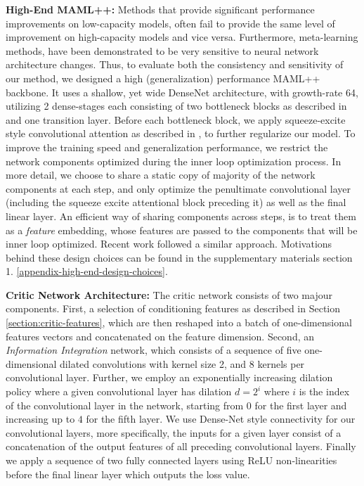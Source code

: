 \documentclass{article} \usepackage[dvipsnames]{xcolor}
\begin{document}
\textbf{High-End MAML++:}
Methods that provide significant performance improvements on low-capacity models, often fail to provide the same level of improvement on high-capacity models and vice versa. Furthermore, meta-learning methods, have been demonstrated to be very sensitive to neural network architecture changes. Thus, to evaluate both the consistency and sensitivity of our method, we designed a high (generalization) performance MAML++ backbone. It uses a shallow, yet wide DenseNet architecture, with growth-rate 64, utilizing 2 dense-stages each consisting of two bottleneck blocks as described in \cite{huang2017densely} and one transition layer. Before each bottleneck block, we apply squeeze-excite style convolutional attention as described in \cite{hu2018squeeze}, to further regularize our model. To improve the training speed and generalization performance, we restrict the network components optimized during the inner loop optimization process. In more detail, we choose to share a static copy of majority of the network components at each step, and only optimize the penultimate convolutional layer (including the squeeze excite attentional block preceding it) as well as the final linear layer. An efficient way of sharing components across steps, is to treat them as a \emph{feature} embedding, whose features are passed to the components that will be inner loop optimized. Recent work \citep{rusu2018meta,qiao2018few} followed a similar approach. Motivations behind these design choices can be found in the supplementary materials section 1. \ref{appendix-high-end-design-choices}.

\textbf{Critic Network Architecture:}
The critic network consists of two majour components. First, a selection of conditioning features as described in Section \ref{section:critic-features}, which are then reshaped into a batch of one-dimensional features vectors and concatenated on the feature dimension. Second, an \emph{Information Integration} network, which consists of a sequence of five one-dimensional dilated convolutions with kernel size 2, and 8 kernels per convolutional layer. Further, we employ an exponentially increasing dilation policy where a given convolutional layer has dilation $d = 2^i$ where $i$ is the index of the convolutional layer in the network, starting from $0$ for the first layer and increasing up to $4$ for the fifth layer. We use Dense-Net style connectivity for our convolutional layers, more specifically, the inputs for a given layer consist of a concatenation of the output features of all preceding convolutional layers. Finally we apply a sequence of two fully connected layers using ReLU non-linearities before the final linear layer which outputs the loss value.
\end{document}
